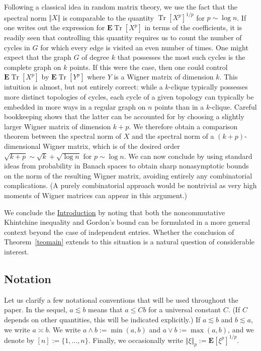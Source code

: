 \documentclass[aop,MSNbibl,dvips]{arximspdf}
\newcommand{\rrVert}{\Vert}
\newcommand{\llVert}{\Vert}
\newcommand{\EE}{\mathbf{E}}
\newcommand{\Tr}{\operatorname{Tr}}
\begin{document}
Following\vspace*{1pt} a classical idea in random matrix theory, we use the fact that
the spectral norm $\llVert X\rrVert $ is comparable to the quantity
$\Tr[X^p]^{1/p}$
for $p\sim\log n$. If one writes out the expression for $\EE\Tr
[X^p]$ in
terms of the coefficients, it is readily seen that controlling this
quantity requires us to count the number of cycles in $G$ for which every
edge is visited an even number of times.
One might expect that the graph $G$ of degree $k$ that possesses the most
such cycles is the complete graph on $k$ points. If this were the case,
then one could control
$\EE\Tr[X^p]$ by $\EE\Tr[Y^p]$ where $Y$ is a Wigner matrix of dimension
$k$. This intuition is almost, but not entirely correct: while a
$k$-clique typically possesses more distinct topologies of cycles, each
cycle of a given topology can typically be embedded in more ways in a
regular graph on $n$ points than in a $k$-clique. Careful bookkeeping
shows that the latter can be accounted for by choosing a slightly larger
Wigner matrix of dimension $k+p$. We therefore obtain a comparison theorem
between the spectral norm of $X$ and the spectral norm of a
$(k+p)$-dimensional\vspace*{1pt} Wigner matrix, which is of the desired order
$\sqrt{k+p}\sim\sqrt{k}+\sqrt{\log n}$ for $p\sim\log n$. We can now
conclude by using standard ideas from probability in Banach spaces to
obtain sharp nonasymptotic bounds on the norm of the resulting Wigner
matrix, avoiding entirely any combinatorial complications. (A purely
combinatorial approach would be nontrivial as very high moments of Wigner
matrices can appear in this argument.)

We conclude the \hyperref[sec1]{Introduction} by noting that both the noncommutative
Khintchine inequality and Gordon's bound can be formulated in a more
general context beyond the case of independent entries. Whether the
conclusion of Theorem~\ref{teomain} extends to this situation is a
natural question of considerable interest.

\subsection*{Notation}

Let us clarify a few notational conventions that will be used throughout
the paper. In the sequel, $a\lesssim b$ means that $a\le Cb$ for a
universal constant $C$. (If $C$ depends on other quantities,
this will be indicated explicitly.) If $a\lesssim b$ and $b\lesssim a$, we
write $a\asymp b$. We write $a\wedge b:=\min(a,b)$ and $a\vee b
:=\max(a,b)$, and we denote by $[n]:=\{1,\ldots,n\}$. Finally, we
occasionally write $\llVert \xi\rrVert _p := \EE[\xi^p]^{1/p}$.
\end{document}
